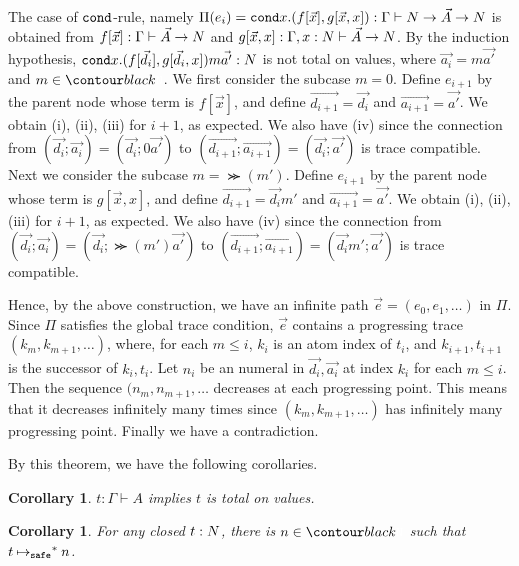 \documentclass{article}
\newtheorem{corollary}[theorem]{Corollary}
\newenvironment{proof}[1][Proof]{\begin{trivlist}
\item[\hskip \labelsep {\bfseries #1}]}{\end{trivlist}}
\begin{document}
\begin{proof}
  The case of ${\tt cond}$-rule, namely
  $\Pi(e_i) = {\tt cond} x.(f[\vec{x}],g[\vec{x},x]):\Gamma\vdash {N}\rightarrow\vec{A}\rightarrow{N}$
  is obtained from 
  $f[\vec{x}]:\Gamma\vdash \vec{A}\rightarrow{N}$
  and
  $g[\vec{x},x]:\Gamma,x:{N}\vdash \vec{A}\rightarrow{N}$. 
  By the induction hypothesis, ${\tt cond} x.(f[\vec{d_i}],g[\vec{d_i},x])m\vec{a'}:{N}$ is not total on values,
  where $\vec{a_i} = m\vec{a'}$ and $m \in \Nat$.
  We first consider the subcase $m=0$.
  Define $e_{i+1}$ by the parent node whose term is $f[\vec{x}]$,
  and define $\vec{d_{i+1}} = \vec{d_i}$ and $\vec{a_{i+1}} = \vec{a'}$. 
  We obtain (i), (ii), (iii) for $i+1$, as expected. 
  We also have (iv) since the connection from 
  $(\vec{d_i};\vec{a_i})=(\vec{d_i};0\vec{a'})$ to $(\vec{d_{i+1}};\vec{a_{i+1}}) = (\vec{d_i};\vec{a'})$
  is trace compatible. 
  Next we consider the subcase $m=\Succ(m')$. 
  Define $e_{i+1}$ by the parent node whose term is $g[\vec{x},x]$,
  and define $\vec{d_{i+1}} = \vec{d_i}m'$ and $\vec{a_{i+1}} = \vec{a'}$. 
  We obtain (i), (ii), (iii) for $i+1$, as expected.
  We also have (iv) since the connection from 
  $(\vec{d_i};\vec{a_i})=(\vec{d_i};\Succ(m')\vec{a'})$ to $(\vec{d_{i+1}};\vec{a_{i+1}}) = (\vec{d_i}m';\vec{a'})$
  is trace compatible. 

  Hence, by the above construction, we have an infinite path $\vec{e} = (e_0,e_1,\ldots)$ in $\Pi$.
  Since $\Pi$ satisfies the global trace condition, $\vec{e}$ contains a progressing trace
  $(k_{m},k_{m+1},\ldots)$, where, for each $m\le i$, $k_i$ is an atom index of $t_i$, 
  and $k_{i+1},t_{i+1}$ is the successor of $k_i,t_i$. 
  Let $n_i$ be an numeral in $\vec{d_i},\vec{a_i}$ at index $k_i$ for each $m\le i$.
  Then the sequence $(n_m,n_{m+1},\ldots$ decreases at each progressing point.
  This means that it decreases infinitely many times
  since $(k_{m},k_{m+1},\ldots)$ has infinitely many progressing point.
  Finally we have a contradiction. 
  
\end{proof}

By this theorem, we have the following corollaries. 

\begin{corollary}
  $t: \Gamma\vdash A$ implies $t$ is total on values.
\end{corollary}

\begin{corollary}
  For any closed $t:{N}$, there is $n\in\Nat$ such that $t\mathbin{{\mapsto}_{\tiny \tt safe}}^* n$. 
\end{corollary}
\end{document}
